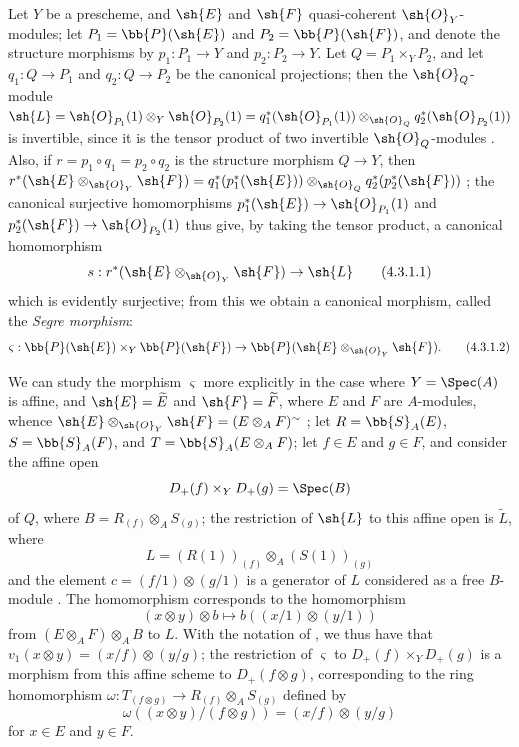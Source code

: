 \begin{env}[4.3.1]
\label{II.4.3.1}
Let $Y$ be a prescheme, and $\sh{E}$ and $\sh{F}$ quasi-coherent $\sh{O}_Y$-modules;
let $P_1=\bb{P}(\sh{E})$ and $P_2=\bb{P}(\sh{F})$, and denote the structure morphisms by $p_1:P_1\to Y$ and $p_2:P_2\to Y$.
Let $Q=P_1\times_Y P_2$, and let $q_1:Q\to P_1$ and $q_2:Q\to P_2$ be the canonical projections;
then the $\sh{O}_Q$-module $\sh{L}=\sh{O}_{P_1}(1)\otimes_Y \sh{O}_{P_2}(1) = q_1^*(\sh{O}_{P_1}(1))\otimes_{\sh{O}_Q}q_2^*(\sh{O}_{P_2}(1))$ is invertible, since it is the tensor product of two invertible $\sh{O}_Q$-modules .
Also, if $r=p_1\circ q_1=p_2\circ q_2$ is the structure morphism $Q\to Y$, then $r^*(\sh{E}\otimes_{\sh{O}_Y}\sh{F}) = q_1^*(p_1^*(\sh{E}))\otimes_{\sh{O}_Q}q_2^*(p_2^*(\sh{F}))$ ;
the canonical surjective homomorphisms  $p_1^*(\sh{E})\to\sh{O}_{P_1}(1)$ and $p_2^*(\sh{F})\to\sh{O}_{P_2}(1)$ thus give, by taking the tensor product, a canonical homomorphism
\[
\label{II.4.3.1.1}
  s: r^*(\sh{E}\otimes_{\sh{O}_Y}\sh{F}) \to \sh{L}
  \tag{4.3.1.1}
\]
which is evidently surjective;
from this we obtain  a canonical morphism, called the \emph{Segre morphism}:
\[
\label{II.4.3.1.2}
  \varsigma: \bb{P}(\sh{E})\times_Y\bb{P}(\sh{F}) \to \bb{P}(\sh{E}\otimes_{\sh{O}_Y}\sh{F}).
  \tag{4.3.1.2}
\]

We can study the morphism $\varsigma$ more explicitly in the case where $Y=\Spec(A)$ is affine, and $\sh{E}=\widetilde{E}$ and $\sh{F}=\widetilde{F}$, where $E$ and $F$ are $A$-modules, whence $\sh{E}\otimes_{\sh{O}_Y}\sh{F}=(E\otimes_A F)^\sim$ ;
let $R=\bb{S}_A(E)$, $S=\bb{S}_A(F)$, and $T=\bb{S}_A(E\otimes_A F)$;
let $f\in E$ and $g\in F$, and consider the affine open
\[
  D_+(f) \times_Y D_+(g) = \Spec(B)
\]
of $Q$, where $B=R_{(f)}\otimes_A S_{(g)}$;
the restriction of $\sh{L}$ to this affine open is $\widetilde{L}$, where
\[
  L = (R(1))_{(f)} \otimes_A (S(1))_{(g)}
\]
and the element $c=(f/1)\otimes(g/1)$ is a generator of $L$ considered as a free $B$-module .
The homomorphism  corresponds to the homomorphism
\[
  (x\otimes y)\otimes b \mapsto b((x/1)\otimes(y/1))
\]
from $(E\otimes_A F)\otimes_A B$ to $L$.
With the notation of , we thus have that $v_1(x\otimes y)=(x/f)\otimes(y/g)$;
the restriction of $\varsigma$ to $D_+(f)\times_Y D_+(g)$ is a morphism from this affine scheme to $D_+(f\otimes g)$, corresponding to the ring homomorphism $\omega:T_{(f\otimes g)}\to R_{(f)}\otimes_A S_{(g)}$ defined by
\[
\label{II.4.3.1.3}
  \omega((x\otimes y)/(f\otimes g)) = (x/f)\otimes(y/g)
  \tag{4.3.1.3}
\]
for $x\in E$ and $y\in F$.
\end{env}

